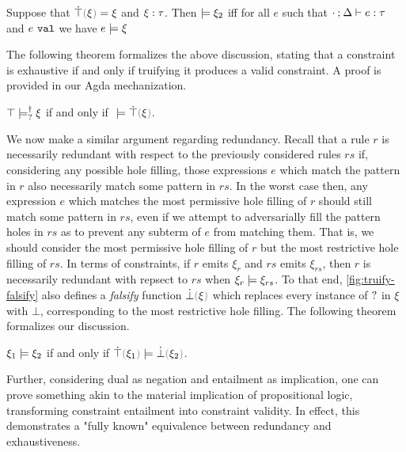  \begin{definition}
 	\label{definition:valid-constraint}
 	Suppose that $\ctruify{\xi}=\xi$ and $\xi : \tau$.
 	Then $\models \xi_2$ iff for all $e$ such that $\cdot \mathbin{;} \Delta \vdash e : \tau$ and $e ~\mathtt{val}$ we have $e \models \xi$
 \end{definition}

The following theorem formalizes the above discussion, stating that a constraint is exhaustive if and only if truifying it produces a valid constraint. A proof is provided in our Agda mechanization.

\begin{theorem}
	\label{theorem:exhaustive-truify}
	$\top \models_{?}^{\dag} \xi$ if and only if $\ccsatisfy{\;}{\ctruify{\xi}}$.
\end{theorem}

We now make a similar argument regarding redundancy. Recall that a rule $r$ is necessarily redundant with respect to the previously considered rules $rs$ if, considering any possible hole filling, those expressions $e$ which match the pattern in $r$ also necessarily match some pattern in $rs$. In the worst case then, any expression $e$ which matches the most permissive hole filling of $r$ should still match some pattern in $rs$, even if we attempt to adversarially fill the pattern holes in $rs$ as to prevent any subterm of $e$ from matching them. That is, we should consider the most permissive hole filling of $r$ but the most restrictive hole filling of $rs$. In terms of constraints, if $r$ emits $\xi_r$ and $rs$ emits $\xi_{rs}$, then $r$ is necessarily redundant with repsect to $rs$ when $\xi_r \models \xi_{rs}$. To that end, \autoref{fig:truify-falsify} also defines a \emph{falsify} function $\cfalsify{\xi}$ which replaces every instance of $\mathtt{?}$ in $\xi$ with $\bot$, corresponding to the most restrictive hole filling. The following theorem formalizes our discussion.

\begin{theorem}
	\label{theorem:redundant-truify-falsify}
	$\xi_1 \models \xi_2$ if and only if $\ccsatisfy{\ctruify{\xi_1}}{\cfalsify{\xi_2}}$.
\end{theorem}

Further, considering dual as negation and entailment as implication, one can prove something akin to the material implication of propositional logic, transforming constraint entailment into constraint validity. In effect, this demonstrates a "fully known" equivalence between redundancy and exhaustiveness.

